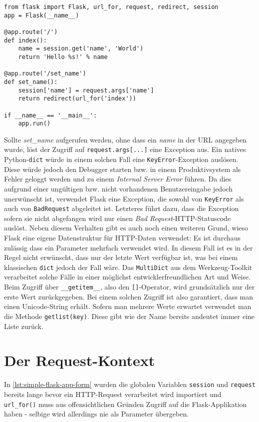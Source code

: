 \begin{lstlisting}[caption=Formularverarbeitung in Flask,label=lst:simple-flask-app-form]
from flask import Flask, url_for, request, redirect, session
app = Flask(__name__)

@app.route('/')
def index():
    name = session.get('name', 'World')
    return 'Hello %s!' % name

@app.route('/set_name')
def set_name():
    session['name'] = request.args['name']
    return redirect(url_for('index'))

if __name__ == '__main__':
    app.run()
\end{lstlisting}

Sollte \emph{set\_name} aufgerufen werden, ohne dass ein \emph{name} in der URL angegeben wurde,
löst der Zugriff auf \lstinline{request.args[...]} eine Exception aus.  Ein natives
Python-\lstinline{dict} würde in einem solchen Fall eine \lstinline{KeyError}-Exception auslösen.
Diese würde jedoch den Debugger starten bzw. in einem Produktivsystem als Fehler geloggt werden und
zu einem \emph{Internal Server Error} führen. Da dies aufgrund einer ungültigen bzw.  nicht
vorhandenen Benutzereingabe jedoch unerwünscht ist, verwendet Flask eine Exception, die sowohl von
\lstinline{KeyError} als auch von \lstinline{BadRequest} abgeleitet ist. Letzteres führt dazu, dass
die Exception sofern sie nicht abgefangen wird nur einen \emph{Bad Request}-HTTP-Statuscode auslöst.
Neben diesem Verhalten gibt es auch noch einen weiteren Grund, wieso Flask eine eigene Datenstruktur
für HTTP-Daten verwendet: Es ist durchaus zulässig dass ein Parameter mehrfach verwendet wird. In
diesem Fall ist es in der Regel nicht erwünscht, dass nur der letzte Wert verfügbar ist, was bei
einem klassischen \lstinline{dict} jedoch der Fall wäre. Das \lstinline{MultiDict} aus dem
Werkzeug-Toolkit verarbeitet solche Fälle in einer möglichst entwicklerfreundlichen Art und Weise.
Beim Zugriff über \lstinline{__getitem__}, also den \lstinline{[]}-Operator, wird grundsätzlich nur
der erste Wert zurückgegeben. Bei einem solchen Zugriff ist also garantiert, dass man einen
Unicode-String erhält. Sofern man mehrere Werte erwartet verwendet man die Methode
\lstinline{getlist(key)}. Diese gibt wie der Name bereits andeutet immer eine Liste zurück.

\section{Der Request-Kontext}

In \autoref{lst:simple-flask-app-form} wurden die globalen Variablen \lstinline{session} und
\lstinline{request} bereits lange bevor ein HTTP-Request verarbeitet wird importiert und
\lstinline{url_for()} muss aus offensichtlichen Gründen Zugriff auf die Flask-Applikation haben -
selbige wird allerdings nie als Parameter übergeben.

